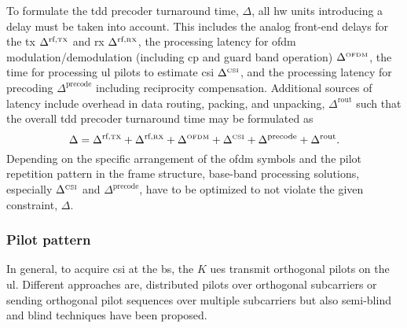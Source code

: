 \documentclass[journal]{IEEEtran}
\begin{document}
To formulate the \gls{tdd} precoder turnaround time, $\Delta$, all \gls{hw} units introducing a delay must be taken into account.
This includes the analog front-end delays for the \gls{tx} $\Delta^\text{rf,\tiny{TX}}$ and \gls{rx} $\Delta^\text{rf,\tiny{RX}}$, the processing latency for \gls{ofdm} modulation/demodulation (including \gls{cp} and guard band operation) $\Delta^\text{\tiny{OFDM}}$, the time for processing \gls{ul} pilots to estimate \gls{csi} $\Delta^\text{\tiny{CSI}}$, and the processing latency for precoding $\Delta^\text{precode}$ including reciprocity compensation.
Additional sources of latency include overhead in data routing, packing, and unpacking, \ie $\Delta^\text{rout}$ such that the overall \gls{tdd} precoder turnaround time may be formulated as
\begin{equation}
\Delta = \Delta^\text{rf,\tiny{TX}}+\Delta^\text{rf,\tiny{RX}}+\Delta^\text{\tiny{OFDM}}+\Delta^\text{\tiny{CSI}} + \Delta^\text{precode} + \Delta^\text{rout}.
\label{eq:latency}
\end{equation}
Depending on the specific arrangement of the \gls{ofdm} symbols and the pilot repetition pattern in the frame structure, base-band processing solutions, especially $\Delta^\text{\tiny{CSI}}$ and $\Delta^\text{precode}$, have to be optimized to not violate the given constraint, \ie $\Delta$. 
%

\subsubsection{Pilot pattern}
In general, to acquire \gls{csi} at the \gls{bs}, the $K$ \glspl{ue} transmit orthogonal pilots on the \gls{ul}.
Different approaches are, \eg distributed pilots over orthogonal subcarriers\cite{deliverable3_2} or sending orthogonal pilot sequences over multiple subcarriers\cite{6783987,Pilot1,Pilot2} but also semi-blind and blind techniques have been proposed\cite{7339665}.
\end{document}
